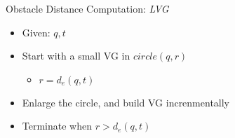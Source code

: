 \begin{frame}{Obstacle Distance Computation: \textit{LVG}}
\begin{minipage}{.4\textwidth}
\begin{itemize}
\item \small Given: $q, t$
\item \small Start with a small VG in $circle(q, r)$
\begin{itemize}
    \item \small $r=d_e(q,t)$
\end{itemize}
\item \small Enlarge the circle, and build VG increnmentally
\item \small Terminate when $r>d_e(q, t)$
\end{itemize}
\end{minipage}%
\begin{minipage}{.6\textwidth}
\begin{adjustbox}{max totalsize={.9\textwidth}{.9\textheight}, right}
    \only<1>{}
    \only<2>{}
\end{adjustbox}
\end{minipage}
\end{frame}